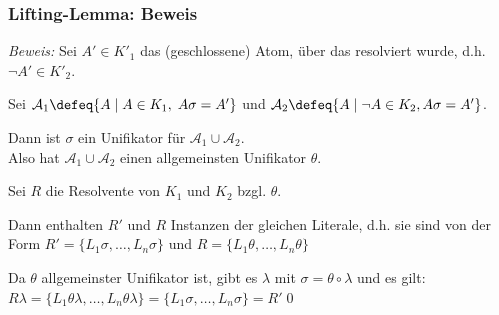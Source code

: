 \documentclass[aspectratio=1610,onlymath]{beamer}
\begin{document}
\begin{frame}\frametitle{Lifting-Lemma: Beweis}


\emph{Beweis:} Sei $A'\in K'_1$ das (geschlossene) Atom, über das resolviert wurde, d.h. $\neg A'\in K'_2$.\smallskip\pause

Sei $\mathcal{A}_1\defeq\{A\mid A\in K_1,\;A\sigma=A'\}$ und $\mathcal{A}_2\defeq\{A\mid \neg A\in K_2, A\sigma=A'\}$.\smallskip\pause

Dann ist $\sigma$ ein Unifikator für $\mathcal{A}_1\cup\mathcal{A}_2$.\\ Also hat $\mathcal{A}_1\cup\mathcal{A}_2$ einen allgemeinsten Unifikator $\theta$.\smallskip\pause

Sei $R$ die Resolvente von $K_1$ und $K_2$ bzgl. $\theta$.\smallskip\pause

Dann enthalten $R'$ und $R$ Instanzen der gleichen Literale, d.h. sie sind von der Form
$R'=\{L_1\sigma,\ldots,L_n\sigma\}$ und $R=\{L_1\theta,\ldots,L_n\theta\}$\smallskip\pause

Da $\theta$ allgemeinster Unifikator ist, gibt es $\lambda$ mit $\sigma=\theta\circ\lambda$
und es gilt: $R\lambda=\{L_1\theta\lambda,\ldots,L_n\theta\lambda\}=\{L_1\sigma,\ldots,L_n\sigma\}=R'$\qed


\end{frame}
\end{document}
